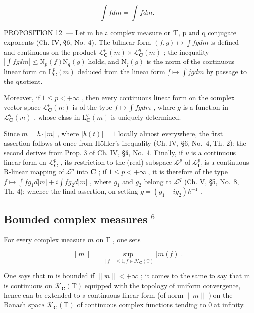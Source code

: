 \[
\int \overline {{f}} d \overline {{m}} = \overline {{\int f d m}}.
\]

PROPOSITION 12. --- Let m be a complex measure on T, p and q conjugate exponents (Ch. IV, §6, No.~4). The bilinear form \((f,g)\mapsto\int fg dm\) is defined and continuous on the product \(\mathcal{L}_{\mathbf{C}}^{p}(m)\times\mathcal{L}_{\mathbf{C}}^{q}(m)\) ; the inequality \(\left|\int fg dm\right|\leqslant\mathrm{N}_{p}(f)\mathrm{N}_{q}(g)\) holds, and \(\mathrm{N}_{q}(g)\) is the norm of the continuous linear form on \(\mathrm{L}_{\mathbf{C}}^{p}(m)\) deduced from the linear form \(f\mapsto\int fg dm\) by passage to the quotient.

Moreover, if \(1 \leqslant p < +\infty\) , then every continuous linear form on the complex vector space \(\mathcal{L}_{\mathbf{C}}^{p}(m)\) is of the type \(f \mapsto \int fg dm\) , where \(g\) is a function in \(\mathcal{L}_{\mathbf{C}}^{q}(m)\) , whose class in \(\mathrm{L}_{\mathbf{C}}^{q}(m)\) is uniquely determined.

Since \(m = h \cdot |m|\) , where \(|h(t)| = 1\) locally almost everywhere, the first assertion follows at once from Hölder's inequality (Ch. IV, §6, No.~4, Th. 2); the second derives from Prop. 3 of Ch. IV, §6, No.~4. Finally, if \(u\) is a continuous linear form on \(\mathcal{L}_{\mathbf{C}}^{p}\) , its restriction to the (real) subspace \(\mathcal{L}^p\) of \(\mathcal{L}_{\mathbf{C}}^{p}\) is a continuous R-linear mapping of \(\mathcal{L}^p\) into \(\mathbf{C}\) ; if \(1 \leqslant p < +\infty\) , it is therefore of the type \(f \mapsto \int fg_1 d|m| + i \int fg_2 d|m|\) , where \(g_1\) and \(g_2\) belong to \(\mathcal{L}^q\) (Ch. V, §5, No.~8, Th. 4); whence the final assertion, on setting \(g = (g_1 + ig_2)h^{-1}\) .

\subsection{\texorpdfstring{Bounded complex measures \(^{6}\)}{Bounded complex measures (note 6)}}

For every complex measure \(m\) on \(\mathrm{T}\) , one sets

\[
\| m \| = \sup _ {\| f \| \leqslant 1,   f \in \mathcal {K} _ {\mathbf {C}} (\mathrm{T})} | m (f) |.
\]

One says that m is bounded if \(\|m\| < +\infty\) ; it comes to the same to say that m is continuous on \(\mathcal{K}_{\mathbf{C}}(\mathrm{T})\) equipped with the topology of uniform convergence, hence can be extended to a continuous linear form (of norm \(\|m\|\) ) on the Banach space \(\overline{\mathcal{K}_{\mathbf{C}}(\mathrm{T})}\) of continuous complex functions tending to 0 at infinity.

